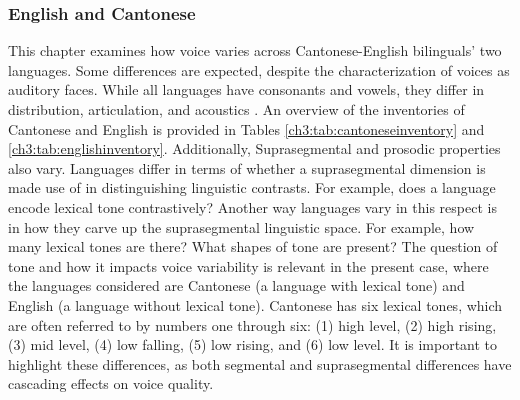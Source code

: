 \subsubsection{English and Cantonese}

This chapter examines how voice varies across Cantonese-English bilinguals' two languages. Some differences are expected, despite the characterization of voices as auditory faces. While all languages have consonants and vowels, they differ in distribution, articulation, and acoustics . An overview of the inventories of Cantonese and English is provided in Tables \ref{ch3:tab:cantoneseinventory} and \ref{ch3:tab:englishinventory}. Additionally, Suprasegmental and prosodic properties also vary. Languages differ in terms of whether a suprasegmental dimension is made use of in distinguishing linguistic contrasts. For example, does a language encode lexical tone contrastively? Another way languages vary in this respect is in how they carve up the suprasegmental linguistic space. For example, how many lexical tones are there? What shapes of tone are present? The question of tone and how it impacts voice variability is relevant in the present case, where the languages considered are Cantonese (a language with lexical tone) and English (a language without lexical tone). Cantonese has six lexical tones, which are often referred to by numbers one through six: (1) high level, (2) high rising, (3) mid level, (4) low falling, (5) low rising, and (6) low level. It is important to highlight these differences, as both segmental and suprasegmental differences have cascading effects on voice quality. 

